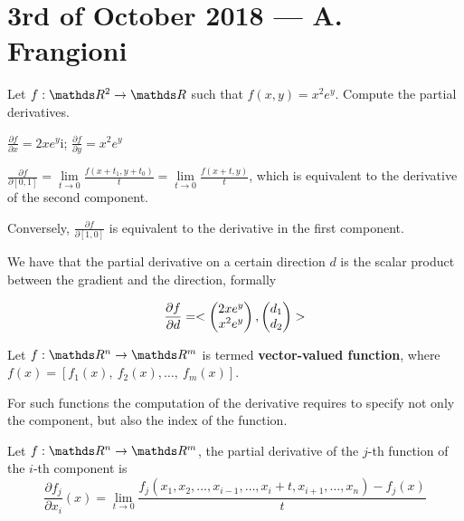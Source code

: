 \documentclass[computationalMathematics.tex]{subfiles}
\begin{document}
\section{3rd of October 2018 --- A. Frangioni}
\begin{example}[On derivatives]
Let $f:\R^2 \to \R$ such that $f(x, y) = x^2 e^y$. Compute the partial derivatives.

$\frac{\partial f}{\partial x} = 2x e^y $i; $\frac{\partial f}{\partial y} = x^2 e^y $

$\frac{\partial f}{\partial [0, 1]} = \lim\limits_{t \to 0} \frac{f(x + t_1, y + t_0)}{t} =  \lim\limits_{t \to 0} \frac{f(x + t, y)}{t}$, which is equivalent to the derivative of the second component.

Conversely, $\frac{\partial f}{\partial [1, 0]}$ is equivalent to the derivative in the first component.
\end{example}
We have that the partial derivative on a certain direction $d$ is the scalar product between the gradient and the direction, formally

\[
  \frac{\partial f}{\partial d} = <\begin{pmatrix}2x e^y\\ x^2 e^y\end{pmatrix}, \begin{pmatrix} d_1\\ d_2 \end{pmatrix}>
\]

\begin{definition}
  Let $f: \R^n \to \R^m$ is termed \textbf{vector-valued function}, where $f(x) =  [f_1(x),~f_2(x), \ldots,~f_m(x)]$.
\end{definition}

For such functions the computation of the derivative requires to specify not only the component, but also the index of the function.

\begin{definition}
Let $f: \R^n \to \R^m$, the partial derivative of the $j$-th function of the $i$-th component is
\[
   \frac{\partial f_{j}}{\partial x_i}(x) =
   \lim_{t \to 0} \frac{f_{j}(x_1, x_2, \ldots, x_{i-1}, \ldots, x_i + t, x_{i+1}, \ldots, x_n) - f_{j}(x)}{t}
\]
\end{definition}
\end{document}
